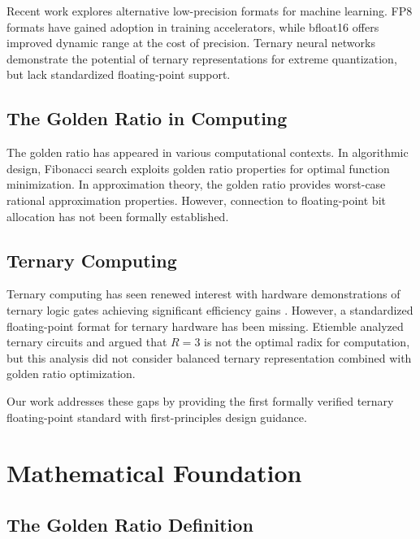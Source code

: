 \documentclass{article}
\begin{document}
Recent work explores alternative low-precision formats for machine learning. FP8 formats \cite{sun2019fp8} have gained adoption in training accelerators, while bfloat16 offers improved dynamic range at the cost of precision. Ternary neural networks \cite{zhu2016ternary} demonstrate the potential of ternary representations for extreme quantization, but lack standardized floating-point support.

\subsection{The Golden Ratio in Computing}

The golden ratio has appeared in various computational contexts. In algorithmic design, Fibonacci search exploits golden ratio properties for optimal function minimization. In approximation theory, the golden ratio provides worst-case rational approximation properties. However, connection to floating-point bit allocation has not been formally established.

\subsection{Ternary Computing}

Ternary computing has seen renewed interest with hardware demonstrations of ternary logic gates achieving significant efficiency gains \cite{huawei2025}. However, a standardized floating-point format for ternary hardware has been missing. Etiemble \cite{etiemble2019} analyzed ternary circuits and argued that $R=3$ is not the optimal radix for computation, but this analysis did not consider balanced ternary representation combined with golden ratio optimization.

Our work addresses these gaps by providing the first formally verified ternary floating-point standard with first-principles design guidance.


\section{Mathematical Foundation}

\subsection{The Golden Ratio Definition}
\end{document}
